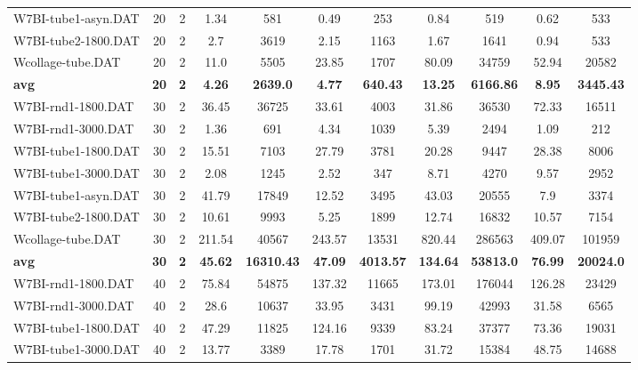\begin{table}[!ht]
\begin{tabular}{lcccccccccc}
W7BI-tube1-asyn.DAT & 20 & 2 & 1.34 & 581 &  \textcolor{blue2}{0.49} & 253 & 0.84 & 519 & 0.62 & 533 \\
W7BI-tube2-1800.DAT & 20 & 2 & 2.7 & 3619 & 2.15 & 1163 & 1.67 & 1641 &  \textcolor{blue2}{0.94} & 533 \\
Wcollage-tube.DAT & 20 & 2 &  \textcolor{blue2}{11.0} & 5505 & 23.85 & 1707 & 80.09 & 34759 & 52.94 & 20582 \\
\cline{1-11} \textbf{avg} & \textbf{20} & \textbf{2} & \textbf{4.26} & \textbf{2639.0} & \textbf{4.77} & \textbf{640.43} & \textbf{13.25} & \textbf{6166.86} & \textbf{8.95} & \textbf{3445.43} \\ \cline{1-11}
W7BI-rnd1-1800.DAT & 30 & 2 & 36.45 & 36725 & 33.61 & 4003 &  \textcolor{blue2}{31.86} & 36530 & 72.33 & 16511 \\
W7BI-rnd1-3000.DAT & 30 & 2 & 1.36 & 691 & 4.34 & 1039 & 5.39 & 2494 &  \textcolor{blue2}{1.09} & 212 \\
W7BI-tube1-1800.DAT & 30 & 2 &  \textcolor{blue2}{15.51} & 7103 & 27.79 & 3781 & 20.28 & 9447 & 28.38 & 8006 \\
W7BI-tube1-3000.DAT & 30 & 2 &  \textcolor{blue2}{2.08} & 1245 & 2.52 & 347 & 8.71 & 4270 & 9.57 & 2952 \\
W7BI-tube1-asyn.DAT & 30 & 2 & 41.79 & 17849 & 12.52 & 3495 & 43.03 & 20555 &  \textcolor{blue2}{7.9} & 3374 \\
W7BI-tube2-1800.DAT & 30 & 2 & 10.61 & 9993 &  \textcolor{blue2}{5.25} & 1899 & 12.74 & 16832 & 10.57 & 7154 \\
Wcollage-tube.DAT & 30 & 2 &  \textcolor{blue2}{211.54} & 40567 & 243.57 & 13531 & 820.44 & 286563 & 409.07 & 101959 \\
\cline{1-11} \textbf{avg} & \textbf{30} & \textbf{2} & \textbf{45.62} & \textbf{16310.43} & \textbf{47.09} & \textbf{4013.57} & \textbf{134.64} & \textbf{53813.0} & \textbf{76.99} & \textbf{20024.0} \\ \cline{1-11}
W7BI-rnd1-1800.DAT & 40 & 2 &  \textcolor{blue2}{75.84} & 54875 & 137.32 & 11665 & 173.01 & 176044 & 126.28 & 23429 \\
W7BI-rnd1-3000.DAT & 40 & 2 &  \textcolor{blue2}{28.6} & 10637 & 33.95 & 3431 & 99.19 & 42993 & 31.58 & 6565 \\
W7BI-tube1-1800.DAT & 40 & 2 &  \textcolor{blue2}{47.29} & 11825 & 124.16 & 9339 & 83.24 & 37377 & 73.36 & 19031 \\
W7BI-tube1-3000.DAT & 40 & 2 &  \textcolor{blue2}{13.77} & 3389 & 17.78 & 1701 & 31.72 & 15384 & 48.75 & 14688 \\

\end{tabular}
\end{table}

